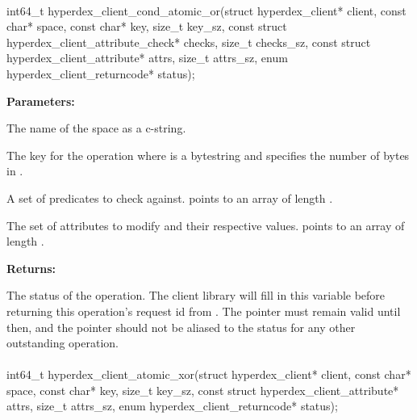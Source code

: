 \paragraph{}
\label{api:c:cond_atomic_or}
\begin{ccode}
int64_t hyperdex_client_cond_atomic_or(struct hyperdex_client* client,
                const char* space,
                const char* key, size_t key_sz,
                const struct hyperdex_client_attribute_check* checks, size_t checks_sz,
                const struct hyperdex_client_attribute* attrs, size_t attrs_sz,
                enum hyperdex_client_returncode* status);
\end{ccode}
\funcdesc 

\noindent\textbf{Parameters:}
\begin{description}[labelindent=\widthof{{\code{checks}, \code{checks\_sz}}},leftmargin=*,noitemsep,nolistsep,align=right]
\item[\code{space}] The name of the space as a c-string.
\item[\code{key}, \code{key\_sz}] The key for the operation where  is a bytestring and  specifies the number of bytes in .
\item[\code{checks}, \code{checks\_sz}] A set of predicates to check against.   points to an array of length .
\item[\code{attrs}, \code{attrs\_sz}] The set of attributes to modify and their respective values.   points to an array of length .
\end{description}

\noindent\textbf{Returns:}
\begin{description}[labelindent=\widthof{{\code{status}}},leftmargin=*,noitemsep,nolistsep,align=right]
\item[\code{status}] The status of the operation.  The client library will fill in this variable before returning this operation's request id from .  The pointer must remain valid until then, and the pointer should not be aliased to the status for any other outstanding operation.
\end{description}

\paragraph{}
\label{api:c:atomic_xor}
\begin{ccode}
int64_t hyperdex_client_atomic_xor(struct hyperdex_client* client,
                const char* space,
                const char* key, size_t key_sz,
                const struct hyperdex_client_attribute* attrs, size_t attrs_sz,
                enum hyperdex_client_returncode* status);
\end{ccode}
\funcdesc 

